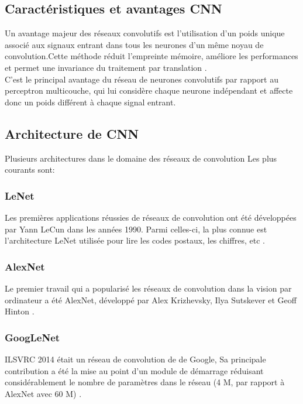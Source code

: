 \documentclass[12pt]{report}
\begin{document}
\subsection{Caractéristiques et avantages CNN}
Un avantage majeur des réseaux convolutifs est l'utilisation d'un poids unique associé aux signaux entrant dans tous les neurones d'un même noyau de convolution.Cette méthode réduit l'empreinte mémoire, améliore les performances et permet une invariance du traitement par translation \cite{ref14}.\\
C'est le principal avantage du réseau de neurones convolutifs par rapport au perceptron multicouche, qui lui considère chaque neurone indépendant et affecte donc un poids différent à chaque signal entrant.

\subsection{Architecture de CNN}
Plusieurs architectures dans le domaine des réseaux de convolution Les plus courants sont:
\subsubsection{LeNet}
Les premières applications réussies de réseaux de convolution ont été développées par Yann LeCun dans les années 1990. Parmi celles-ci, la plus connue est l'architecture LeNet utilisée pour lire les codes postaux, les chiffres, etc \cite{ref15} .
\subsubsection{AlexNet}
Le premier travail qui a popularisé les réseaux de convolution dans la vision par ordinateur a été AlexNet, développé par Alex Krizhevsky, Ilya Sutskever et Geoff Hinton  .
\subsubsection{GoogLeNet}
ILSVRC 2014 était un réseau de convolution de de Google, Sa principale contribution a été la mise au point d'un module de démarrage réduisant considérablement le nombre de paramètres dans le réseau (4 M, par rapport à AlexNet avec 60 M) \cite{ref15}.
\end{document}
